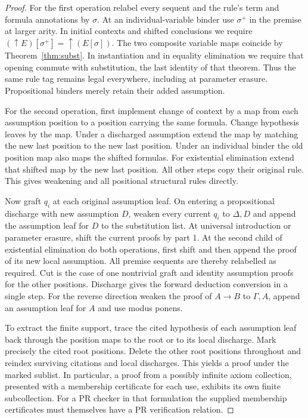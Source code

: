 \begin{proof}
For the first operation relabel every sequent and the rule's term and
formula annotations by $\sigma$. At an individual-variable binder use
$\sigma^+$ in the premise at larger arity. In initial contexts and
shifted conclusions we require
$(\uparrow E)[\sigma^+]=\uparrow(E[\sigma])$. The two composite
variable maps coincide by Theorem~\ref{thm:subst}. In instantiation
and in equality elimination we require that opening commute with
substitution, the last identity of that theorem. Thus the same rule
tag remains legal everywhere, including at parameter erasure.
Propositional binders merely retain their added assumption.

For the second operation, first implement change of context by a map
from each assumption position to a position carrying the same formula.
Change hypothesis leaves by the map. Under a discharged assumption
extend the map by matching the new last position to the new last
position. Under an individual binder the old position map also maps the
shifted formulas. For existential elimination extend that shifted map
by the new last position. All other steps copy their original rule.
This gives weakening and all positional structural rules directly.

Now graft $q_i$ at each original assumption leaf. On entering a
propositional discharge with new assumption $D$, weaken every current
$q_i$ to $\Delta,D$ and append the assumption leaf for $D$ to the
substitution list. At universal introduction or parameter erasure,
shift the current proofs by part 1. At the second child of existential
elimination do both operations, first shift and then append the proof
of its new local assumption. All premise sequents are thereby relabelled
as required. Cut is the case of one nontrivial graft and identity
assumption proofs for the other positions. Discharge gives the forward
deduction conversion in a single step. For the reverse direction weaken
the proof of $A\to B$ to $\Gamma,A$, append an assumption leaf for
$A$ and use modus ponens.

To extract the finite support, trace the cited hypothesis of each
assumption leaf back through the position maps to the root or to its
local discharge. Mark precisely the cited root positions. Delete the
other root positions throughout and reindex surviving citations and local
discharges. This yields a proof under the marked sublist. In particular,
a proof from a possibly infinite axiom collection, presented with a
membership certificate for each use, exhibits its own finite subcollection.
For a PR checker in that formulation the supplied membership certificates
must themselves have a PR verification relation.


\end{proof}
